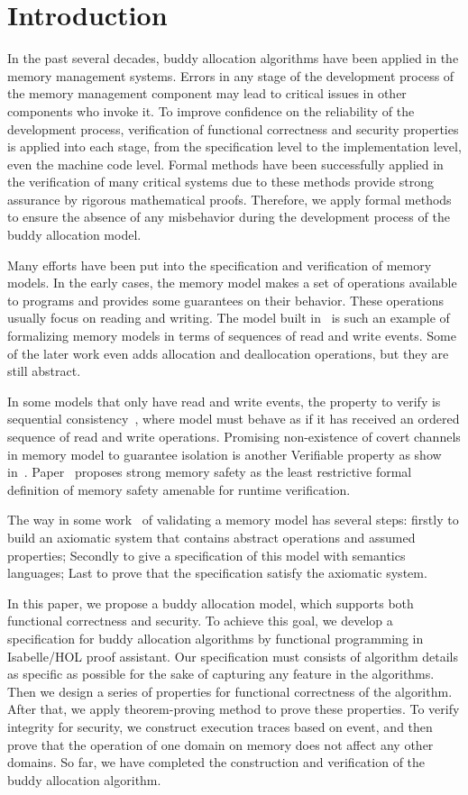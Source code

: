 \documentclass[runningheads]{llncs}
\begin{document}
\section{Introduction}
In the past several decades, buddy allocation algorithms have been applied in the memory management systems. Errors in any stage of the development process of the memory management component may lead to critical issues in other components who invoke it. To improve confidence on the reliability of the development process, verification of functional correctness and security properties is applied into each stage, from the specification level to the implementation level, even the machine code level. Formal methods have been successfully applied in the verification of many critical systems due to these methods provide strong assurance by rigorous mathematical proofs. Therefore, we apply formal methods to ensure the absence of any misbehavior during the development process of the buddy allocation model.

Many efforts have been put into the specification and verification of memory models. In the early cases, the memory model makes a set of operations available to programs and provides some guarantees on their behavior. These operations usually focus on reading and writing. The model built in~\cite{reg_higham} is such an example of formalizing memory models in terms of sequences of read and write events. Some of the later work even adds allocation and deallocation operations, but they are still abstract. 

In some models that only have read and write events, the property to verify is sequential consistency~\cite{reg_higham}, where model must behave as if it has received an ordered sequence of read and write operations. Promising non-existence of covert channels in memory model to guarantee isolation is another Verifiable property as show in~\cite{reg_peter}. Paper~\cite{reg_rosu} proposes strong memory safety as the least restrictive formal definition of memory safety amenable for runtime verification.

The way in some work~\cite{reg_blazy,reg_mansky} of validating a memory model has several steps: firstly to build an axiomatic system that contains abstract operations and assumed properties; Secondly to give a specification of this model with semantics languages; Last to prove that the specification satisfy the axiomatic system.

In this paper, we propose a buddy allocation model, which supports both functional correctness and security. To achieve this goal, we develop a specification for buddy allocation algorithms by functional programming in Isabelle/HOL proof assistant. Our specification must consists of algorithm details as specific as possible for the sake of capturing any feature in the algorithms. Then we design a series of properties for functional correctness of the algorithm. After that, we apply theorem-proving method to prove these properties. To verify integrity for security, we construct execution traces based on event, and then prove that the operation of one domain on memory does not affect any other domains. So far, we have completed the construction and verification of the buddy allocation algorithm.
\end{document}
